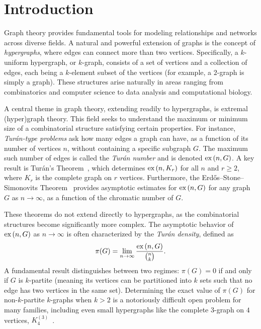 \section{Introduction}\label{sec:introduction}

Graph theory provides fundamental tools for modeling relationships and networks across diverse fields.
A natural and powerful extension of graphs is the concept of \emph{hypergraphs},
where edges can connect more than two vertices.
Specifically, a $k$-uniform hypergraph, or $k$-graph,
consists of a set of vertices and a collection of edges, each being a $k$-element subset of the vertices
(for example, a $2$-graph is simply a graph).
These structures arise naturally in areas ranging from combinatorics and computer science to data analysis and
computational biology.

A central theme in graph theory, extending readily to hypergraphs, is extremal (hyper)graph theory.
This field seeks to understand the maximum or minimum size of a combinatorial structure satisfying certain properties.
For instance, \emph{Turán-type problems} ask how many edges a graph can have, as a function of its number of vertices $n$,
without containing a specific subgraph $G$.
The maximum such number of edges is called the \emph{Turán number} and is denoted $\text{ex} \left( n, G \right)$.
A key result is Turán's Theorem~\cite{Turan1941},
which determines $\text{ex} \left( n, K_r \right)$ for all $n$ and $r \ge 2$, where $K_r$ is the complete graph on $r$ vertices.
Furthermore, the Erdős--Stone--Simonovits Theorem~\cite{erdos1946structure}
provides asymptotic estimates for $\text{ex} \left( n, G \right)$ for any graph $G$ as $n \to \infty$,
as a function of the chromatic number of $G$.

These theorems do not extend directly to hypergraphs, as the combinatorial structures become significantly more complex.
The asymptotic behavior of $\text{ex} \left( n, G \right)$ as $n \to \infty$
is often characterized by the \emph{Turán density}, defined as
\[
    \pi(G) = \lim_{n \to \infty} \frac{\text{ex} \left( n, G \right)}{\binom{n}{k}}.
\]
A fundamental result distinguishes between two regimes: $\pi(G) = 0$ if and only if $G$ is $k$-partite
(meaning its vertices can be partitioned into $k$ sets such that no edge has two vertices in the same set).
Determining the exact value of $\pi(G)$ for non-$k$-partite $k$-graphs when $k > 2$
is a notoriously difficult open problem for many families,
including even small hypergraphs like the complete $3$-graph on $4$ vertices,
$K_4^{(3)}$~\cite{keevash2011hypergraph, razborov20103}.

